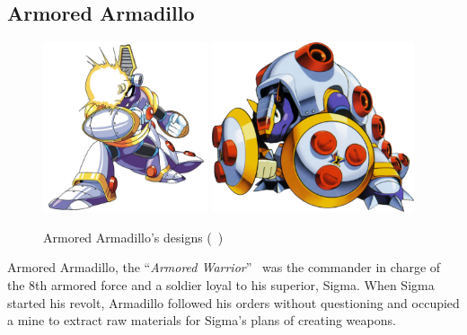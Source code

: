 \subsection{Armored Armadillo}\label{boss:Armored_Armadillo}
\begin{figure}[htp]
	\centering
	\includegraphics[height=5cm]{figures/X1/Armored_armadillo/Armored_armadillo.jpg}
	\includegraphics[height=5cm]{figures/X1/Armored_armadillo/MHXArmoredArmadillo.png}
	\caption{Armored Armadillo's designs (~\cite{book:MMX_Complete_art})}
\end{figure}
Armored Armadillo, the ``\textit{Armored Warrior}''~\cite{book:MMX_Complete_art} was the commander in charge of the 8th armored force and a soldier loyal to his superior, Sigma. When Sigma started his revolt, Armadillo followed his orders without questioning and occupied a mine to extract raw materials for Sigma's plans of creating weapons.
